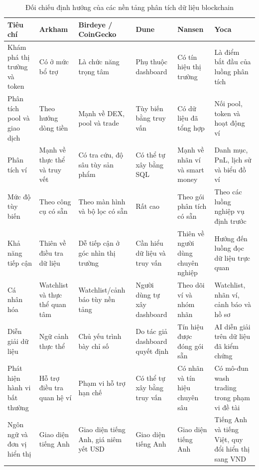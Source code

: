 \begin{table}[H]
\centering
\caption{Đối chiếu định hướng của các nền tảng phân tích dữ liệu blockchain}
\label{tab:platform-comparison}
\renewcommand{\arraystretch}{1.15}
\scriptsize
{}
\begin{tabularx}{\textwidth}{|p{2.3cm}|Y|Y|Y|Y|Y|}
\hline
\textbf{Tiêu chí} & \textbf{Arkham} & \textbf{Birdeye / CoinGecko} & \textbf{Dune} & \textbf{Nansen} & \textbf{Yoca} \\
\hline
Khám phá thị trường và token & Có ở mức bổ trợ & Là chức năng trọng tâm & Phụ thuộc dashboard & Có tín hiệu thị trường & Là điểm bắt đầu của luồng phân tích \\
\hline
Phân tích pool và giao dịch & Theo hướng dòng tiền & Mạnh về DEX, pool và trade & Tùy biến bằng truy vấn & Có dữ liệu đã tổng hợp & Nối pool, token và hoạt động ví \\
\hline
Phân tích ví & Mạnh về thực thể và truy vết & Có tra cứu, độ sâu tùy sản phẩm & Có thể tự xây bằng SQL & Mạnh về nhãn ví và smart money & Danh mục, PnL, lịch sử và biểu đồ ví \\
\hline
Mức độ tùy biến & Theo công cụ có sẵn & Theo màn hình và bộ lọc có sẵn & Rất cao & Theo gói phân tích có sẵn & Theo các luồng nghiệp vụ định trước \\
\hline
Khả năng tiếp cận & Thiên về điều tra dữ liệu & Dễ tiếp cận ở góc nhìn thị trường & Cần hiểu dữ liệu và truy vấn & Thiên về người dùng chuyên nghiệp & Hướng đến luồng đọc dữ liệu trực quan \\
\hline
Cá nhân hóa & Watchlist và thực thể quan tâm & Watchlist/cảnh báo tùy nền tảng & Người dùng tự xây dashboard & Theo dõi ví và nhóm nhãn & Watchlist, nhãn ví, cảnh báo và hồ sơ \\
\hline
Diễn giải dữ liệu & Ngữ cảnh thực thể & Chủ yếu trình bày chỉ số & Do tác giả dashboard quyết định & Tín hiệu được đóng gói sẵn & AI diễn giải trên dữ liệu đã kiểm chứng \\
\hline
Phát hiện hành vi bất thường & Hỗ trợ điều tra quan hệ ví & Phạm vi hỗ trợ hạn chế & Có thể tự xây bằng truy vấn & Có nhãn và tín hiệu chuyên sâu & Có mô-đun wash trading trong phạm vi đề tài \\
\hline
Ngôn ngữ và đơn vị hiển thị & Giao diện tiếng Anh & Giao diện tiếng Anh, giá niêm yết USD & Giao diện tiếng Anh & Giao diện tiếng Anh & Tiếng Anh và tiếng Việt, quy đổi hiển thị sang VND \\
\hline
\end{tabularx}
\end{table}

\FloatBarrier
